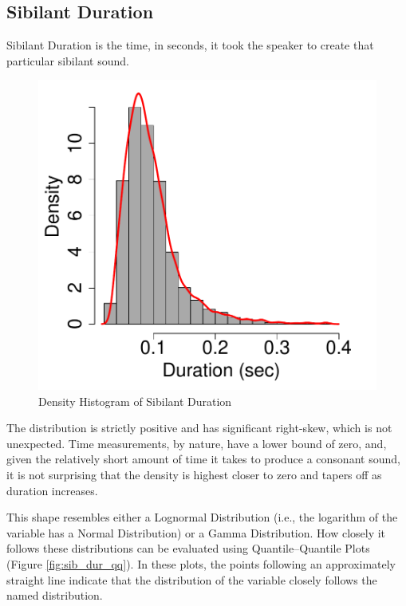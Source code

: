 \documentclass[a4paper]{article}
\begin{document}
\subsection*{Sibilant Duration}
Sibilant Duration is the time, in seconds, it took the speaker to
create that particular sibilant sound.
\begin{figure}[h!]
  \begin{center}
    \begin{minipage}[t]{0.5\linewidth}
      \begin{center}
\includegraphics{prelim-026}
      \end{center}
    \end{minipage}
    \caption{Density Histogram of Sibilant Duration}
    \label{fig:sib_dur_hist}
  \end{center}
\end{figure}

The distribution is strictly positive and has significant
right-skew, which is not unexpected.  Time measurements, by nature,
have a lower bound of zero, and, given the relatively short amount of
time it takes to produce a consonant sound, it is not surprising that
the density is highest closer to zero and tapers off as duration increases.

This shape resembles either a Lognormal Distribution (i.e., the
logarithm of the variable has a Normal Distribution) or a Gamma
Distribution.  How closely it follows these distributions can be
evaluated using Quantile--Quantile Plots (Figure \ref{fig:sib_dur_qq}).
In these plots, the points
following an approximately straight line indicate that the
distribution of the variable closely follows the named distribution.
\end{document}
